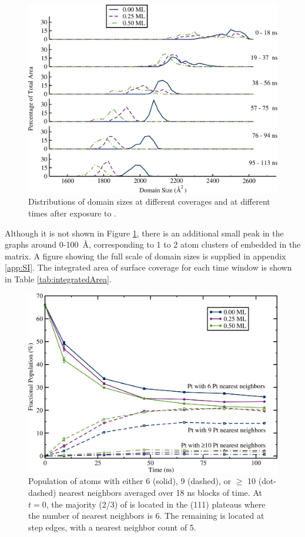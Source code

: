 \begin{figure}[p!]
\includegraphics[width=\linewidth]{../figures/chap3/domains_Pt_110ns.pdf}
\caption{Distributions of  domain sizes at different 
  coverages and at different times after exposure to .}
\label{fig:domainAreasPt}
\end{figure}

Although it is not shown in Figure \ref{fig:domainAreasPt}, there is
an additional small peak in the  graphs around 0-100~\AA,
corresponding to 1 to 2 atom clusters of  embedded in the
 matrix.  A figure showing the full scale of domain sizes is
supplied in appendix \ref{app:SI}.  The integrated area of
surface coverage for each time window is shown in Table
\ref{tab:integratedArea}.

\begin{figure}[p!]
  \includegraphics[width=\linewidth]{../figures/chap3/nn.pdf}
  \caption{Population of  atoms with either 6 (solid), 9
    (dashed), or $\ge$ 10 (dot-dashed)  nearest neighbors
    averaged over 18 ns blocks of time.  At $t=0$, the majority
    (2/3) of  is located in the (111) plateaus where
    the number of  nearest neighbors is 6. The remaining
     is located at step edges, with a nearest neighbor 
    count of 5.} 
\label{fig:nearestNeighbors}
\end{figure}

